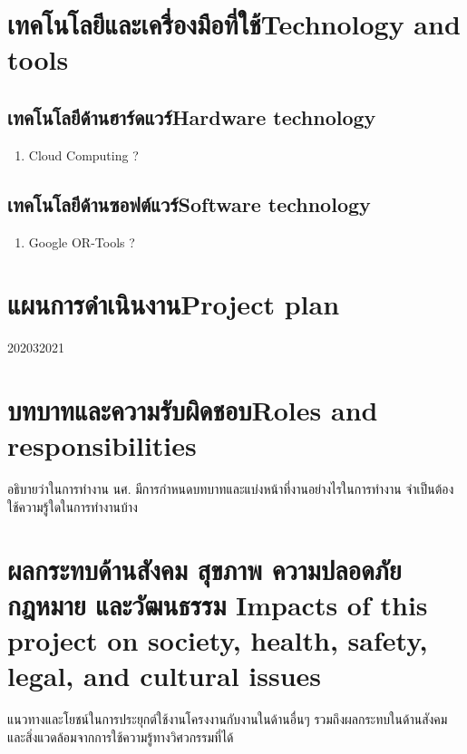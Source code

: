 \section{\ifcpe เทคโนโลยีและเครื่องมือที่ใช้\else Technology and tools\fi}

\subsection{\ifcpe เทคโนโลยีด้านฮาร์ดแวร์\else Hardware technology\fi}
\begin{enumerate}
    \item Cloud Computing ?
\end{enumerate}
\subsection{\ifcpe เทคโนโลยีด้านซอฟต์แวร์\else Software technology\fi}
\begin{enumerate}
    \item Google OR-Tools ?
\end{enumerate}

\section{\ifcpe แผนการดำเนินงาน\else Project plan\fi}

\begin{plan}{7}{2020}{3}{2021}
\end{plan}

\section{\ifcpe บทบาทและความรับผิดชอบ\else Roles and responsibilities\fi}
อธิบายว่าในการทำงาน นศ. มีการกำหนดบทบาทและแบ่งหน้าที่งานอย่างไรในการทำงาน จำเป็นต้องใช้ความรู้ใดในการทำงานบ้าง

\section{\ifcpe%
ผลกระทบด้านสังคม สุขภาพ ความปลอดภัย กฎหมาย และวัฒนธรรม
\else%
Impacts of this project on society, health, safety, legal, and cultural issues
\fi}

แนวทางและโยชน์ในการประยุกต์ใช้งานโครงงานกับงานในด้านอื่นๆ รวมถึงผลกระทบในด้านสังคมและสิ่งแวดล้อมจากการใช้ความรู้ทางวิศวกรรมที่ได้
